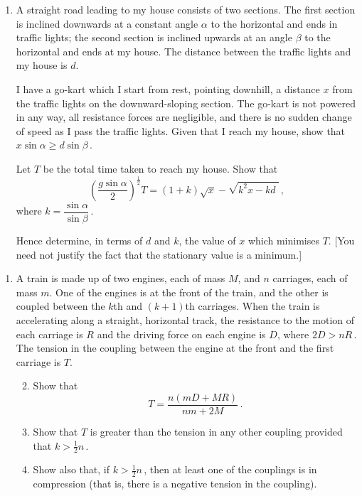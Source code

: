 \documentclass[a4, 11pt]{report}
\newlength{\qspace}
\newcounter{qnumber}
\newenvironment{question}%
 {\vspace{\qspace}
  \begin{enumerate}[\bfseries 1\quad][10]%
    \setcounter{enumi}{\value{qnumber}}%
    \item%
 }
{
  \end{enumerate}
  \filbreak
  \stepcounter{qnumber}
 }
\newenvironment{questionparts}[1][1]%
 {
  \begin{enumerate}[\bfseries (i)]%
    \setcounter{enumii}{#1}
    \addtocounter{enumii}{-1}
    \setlength{\itemsep}{5mm}
    \setlength{\parskip}{8pt}
 }
 {
  \end{enumerate}
 }
\def\ge{\geqslant}
\begin{document}
\begin{question}
A straight
road leading to my house consists of two sections. 
The first section is inclined downwards
at a constant angle $\alpha$
 to the horizontal and ends in traffic lights; 
the second section is inclined
upwards at an angle $\beta$ to the horizontal and ends at my house. 
The distance between the traffic lights and my house
is $d$. 

I have a go-kart which I start from rest, pointing downhill,
 a distance $x$ 
from the traffic lights on the downward-sloping section. 
The go-kart is not powered in any way,  
all resistance forces are negligible, and
there is no sudden change of speed as I pass the traffic lights.
Given that I  reach my house,
 show that 
$x \sin \alpha\ge d \sin\beta\,$.

Let $T$ be the total time taken  to 
 reach my house.
Show that
\[
\left(\frac{g\sin\alpha}2 \right)^{\!\frac12} T = 
(1+k) \sqrt{x} - \sqrt{k^2 x -kd\;}  
\,,
\]
where $k = \dfrac{\sin\alpha}{\sin\beta}\,$.

Hence determine, in terms of $d$ and $k$, the value of $x$
 which minimises $T$. [You need not 
justify the fact that the  stationary value
is a minimum.]

\end{question}





\setcounter{qnumber}{9}
\begin{question}
A train is made up of two engines, each of mass $M$, and $n$ carriages, 
each of mass $m$. One of the engines is at 
the front of the train, 
and the other is coupled between the $k$th and $(k+1)$th carriages. 
When the train is accelerating along a straight, horizontal track, 
the resistance to the motion of each carriage is $R$ 
 and the driving force on each engine is $D$, 
where $2D >nR\,$.
The tension in the coupling between the 
engine at the front 
and the first carriage is $T$.

\begin{questionparts}
\item Show that  
\[
T = \frac{n(mD+MR)}{nm+2M}\,.
\]

\item Show that $T$ 
is greater than  the tension in any other 
coupling provided that $k> \frac12n\,$.
\item
Show also that, if $k> \frac12n\,$, then at least one of the 
couplings is in compression (that is, there is a negative tension
 in the 
coupling).



\end{questionparts}
\end{question}
\end{document}
